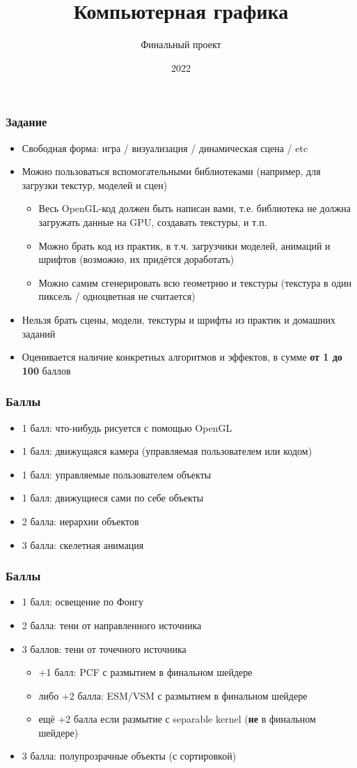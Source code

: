 \documentclass{beamer}
\title{Компьютерная графика}
\subtitle{Финальный проект}
\date{2022}
\begin{document}
\frame{\titlepage}

\begin{frame}[fragile]
\frametitle{Задание}
\begin{itemize}
\item Свободная форма: игра / визуализация / динамическая сцена / etc
\pause
\item Можно пользоваться вспомогательными библиотеками (например, для загрузки текстур, моделей и сцен)
\begin{itemize}
\item Весь OpenGL-код должен быть написан вами, т.е. библиотека не должна загружать данные на GPU, создавать текстуры, и т.п.
\item Можно брать код из практик, в т.ч. загрузчики моделей, анимаций и шрифтов (возможно, их придётся доработать)
\item Можно самим сгенерировать всю геометрию и текстуры (текстура в один пиксель / одноцветная не считается)
\end{itemize}
\pause
\item Нельзя брать сцены, модели, текстуры и шрифты из практик и домашних заданий
\pause
\item Оценивается наличие конкретных алгоритмов и эффектов, в сумме \textbf{от 1 до 100} баллов
\end{itemize}
\end{frame}

\begin{frame}[fragile]
\frametitle{Баллы}
\begin{itemize}
\item 1 балл: что-нибудь рисуется с помощью OpenGL
\item 1 балл: движущаяся камера (управляемая пользователем или кодом)
\item 1 балл: управляемые пользователем объекты
\item 1 балл: движущиеся сами по себе объекты
\item 2 балла: иерархии объектов
\item 3 балла: скелетная анимация
\end{itemize}
\end{frame}

\begin{frame}[fragile]
\frametitle{Баллы}
\begin{itemize}
\item 1 балл: освещение по Фонгу
\item 2 балла: тени от направленного источника
\item 3 баллов: тени от точечного источника
\begin{itemize}
\item +1 балл: PCF с размытием в финальном шейдере
\item либо +2 балла: ESM/VSM с размытием в финальном шейдере
\item ещё +2 балла если размытие с separable kernel (\textbf{не} в финальном шейдере)
\end{itemize}
\item 3 балла: полупрозрачные объекты (с сортировкой)
\end{itemize}
\end{frame}
\end{document}

